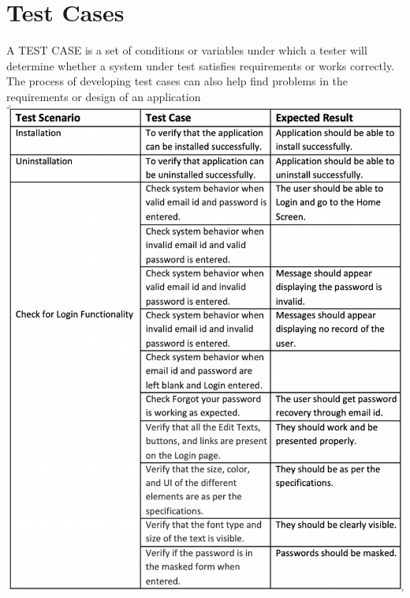 \section{Test Cases}
A TEST CASE is a set of conditions or variables under which a tester will determine whether a system under test satisfies requirements or works correctly. The process of developing test cases can also help find problems in the requirements or design of an application
\newline
\includegraphics[scale=0.9]{testcase1.png}

